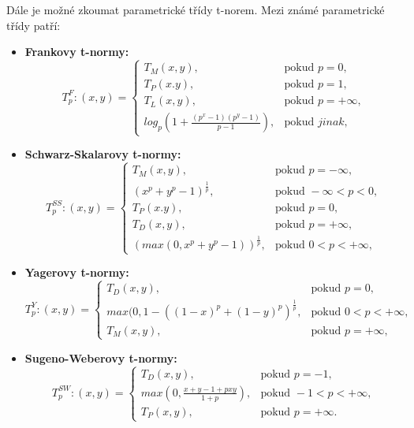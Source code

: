 Dále je možné zkoumat parametrické třídy t-norem. Mezi známé parametrické třídy patří:
\begin{itemize}
    \item \textbf{Frankovy t-normy:}
    $$T_p^F:(x,y)=\begin{cases} T_M(x,y), & \mbox{pokud }  p = 0,\\ 
                                T_P(x.y), & \mbox{pokud } p = 1,\\
                                T_L(x,y), & \mbox{pokud } p = +\infty,\\
                                log_p(1+\frac{(p^x-1)(p^y-1)}{p-1}), & \mbox{pokud } jinak, 
                                \end{cases}$$
    \item \textbf{Schwarz-Skalarovy t-normy:}
    $$T_p^{SS}:(x,y)=\begin{cases} T_M(x,y), & \mbox{pokud }  p = -\infty,\\ 
                                (x^p+y^p-1)^\frac{1}{p}, & \mbox{pokud }  -\infty < p < 0,\\ 
                                T_P(x.y), & \mbox{pokud } p = 0,\\
                                T_D(x,y), & \mbox{pokud } p = +\infty,\\
                                (max(0, x^p+y^p-1))^\frac{1}{p}, & \mbox{pokud } 0 < p < +\infty, \end{cases}$$
    \item \textbf{Yagerovy t-normy:}
    $$T_p^Y:(x,y)=\begin{cases}  T_D(x,y), & \mbox{pokud } p = 0,\\
                                max(0,1-((1-x)^p+(1-y)^p)^\frac{1}{p} , & \mbox{pokud } 0 < p < +\infty,\\
                                T_M(x,y), & \mbox{pokud } p = +\infty,
                                \end{cases}$$
    \item \textbf{Sugeno-Weberovy t-normy:}
    $$T_p^{SW}:(x,y)=\begin{cases}  T_D(x,y), & \mbox{pokud } p = -1,\\
                                    max(0,\frac{x+y-1+pxy}{1+p}) , & \mbox{pokud } -1 < p < +\infty,\\
                                    T_P(x,y), & \mbox{pokud } p = +\infty.
                                    \end{cases}$$
\end{itemize}

